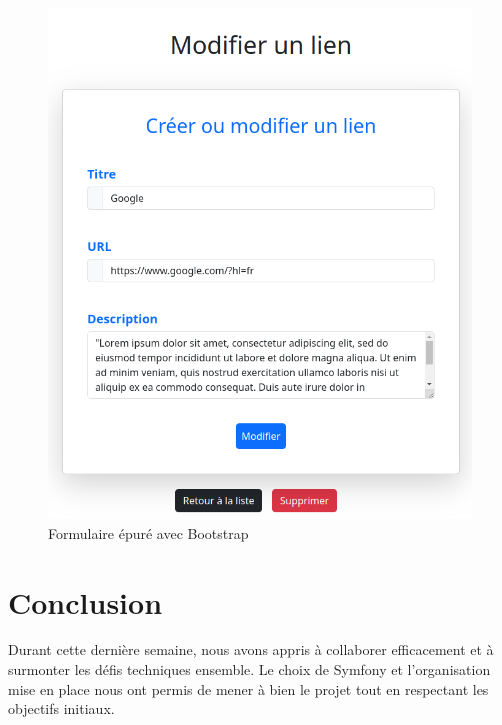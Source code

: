\documentclass[12pt,a4paper]{article}
\begin{document}
\begin{figure}[!h]
	\begin{center}
		\includegraphics[scale=.6]{../images/forms.png}
		\caption{Formulaire épuré avec Bootstrap}
	\end{center}
\end{figure}

\newpage

\section{Conclusion}

Durant cette dernière semaine, nous avons appris à collaborer efficacement et à surmonter les défis techniques ensemble. Le choix de Symfony et l'organisation mise en place nous ont permis de mener à bien le projet tout en respectant les objectifs initiaux. \\


\printbibliography
\end{document}
